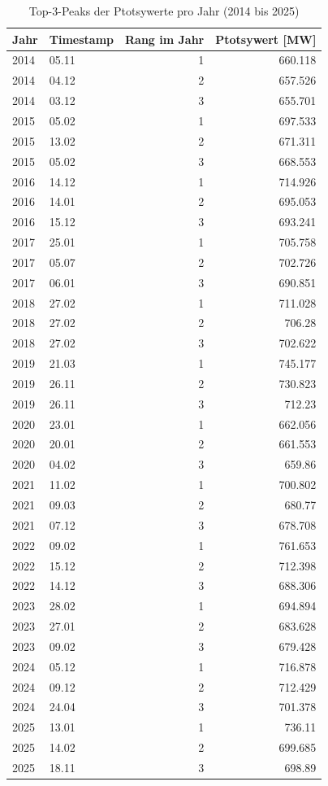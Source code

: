 \documentclass[12pt,oneside]{article}
\begin{document}
\begin{table}[H]
  \centering
  \caption{Top-3-Peaks der Ptotsywerte pro Jahr (2014 bis 2025)}
  \begin{tabular}{llrr}
    \toprule
    Jahr & Timestamp & Rang im Jahr & Ptotsywert [MW] \\
    \midrule
    2014 & 05.11 & 1 & 660.118 \\
    2014 & 04.12 & 2 & 657.526 \\
    2014 & 03.12 & 3 & 655.701 \\
    2015 & 05.02 & 1 & 697.533 \\
    2015 & 13.02 & 2 & 671.311 \\
    2015 & 05.02 & 3 & 668.553 \\
    2016 & 14.12 & 1 & 714.926 \\
    2016 & 14.01 & 2 & 695.053 \\
    2016 & 15.12 & 3 & 693.241 \\
    2017 & 25.01 & 1 & 705.758 \\
    2017 & 05.07 & 2 & 702.726 \\
    2017 & 06.01 & 3 & 690.851 \\
    2018 & 27.02 & 1 & 711.028 \\
    2018 & 27.02 & 2 & 706.28 \\
    2018 & 27.02 & 3 & 702.622 \\
    2019 & 21.03 & 1 & 745.177 \\
    2019 & 26.11 & 2 & 730.823 \\
    2019 & 26.11 & 3 & 712.23 \\
    2020 & 23.01 & 1 & 662.056 \\
    2020 & 20.01 & 2 & 661.553 \\
    2020 & 04.02 & 3 & 659.86 \\
    2021 & 11.02 & 1 & 700.802 \\
    2021 & 09.03 & 2 & 680.77 \\
    2021 & 07.12 & 3 & 678.708 \\
    2022 & 09.02 & 1 & 761.653 \\
    2022 & 15.12 & 2 & 712.398 \\
    2022 & 14.12 & 3 & 688.306 \\
    2023 & 28.02 & 1 & 694.894 \\
    2023 & 27.01 & 2 & 683.628 \\
    2023 & 09.02 & 3 & 679.428 \\
    2024 & 05.12 & 1 & 716.878 \\
    2024 & 09.12 & 2 & 712.429 \\
    2024 & 24.04 & 3 & 701.378 \\
    2025 & 13.01 & 1 & 736.11 \\
    2025 & 14.02 & 2 & 699.685 \\
    2025 & 18.11 & 3 & 698.89 \\
    \bottomrule
  \end{tabular}
\end{table}
\end{document}
